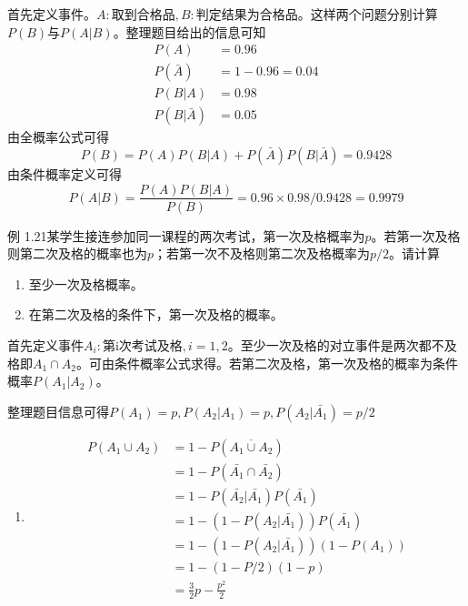 \documentclass{beamer}
\begin{document}
	\begin{frame}
		首先定义事件。$A: \text{取到合格品}, B: \text{判定结果为合格品}$。这样两个问题分别计算$P(B)$与$P(A | B)$。整理题目给出的信息可知
		\begin{align}
			P(A) &= 0.96 \\
			P(\bar{A}) &= 1 - 0.96 = 0.04 \\
			P(B | A) &= 0.98 \\
			P(B | \bar{A}) &= 0.05
		\end{align}
		由全概率公式可得
		\[
		P(B) = P(A) P(B | A) + P(\bar{A}) P(B | \bar{A}) = 0.9428
		\]
		由条件概率定义可得
		\[
		P(A | B) = \frac{P(A)P(B | A)}{P(B)} = 0.96 \times 0.98 / 0.9428 =0.9979
		\]
	\end{frame}
		
	\begin{frame}
		例 1.21某学生接连参加同一课程的两次考试，第一次及格概率为$p$。若第一次及格则第二次及格的概率也为$p$；若第一次不及格则第二次及格概率为$p / 2$。请计算
		\begin{enumerate}
			\item 至少一次及格概率。
			\item 在第二次及格的条件下，第一次及格的概率。
		\end{enumerate}
	\end{frame}
	
	\begin{frame}
		首先定义事件$A_i: \text{第i次考试及格}, i = 1, 2$。至少一次及格的对立事件是两次都不及格即$A_1 \cap A_2$。可由条件概率公式求得。若第二次及格，第一次及格的概率为条件概率$P(A_1 | A_2)$。
		
		\vspace*{1cm}
		整理题目信息可得$P(A_1) = p, P(A_2 | A_1) = p, P(A_2 | \bar{A_1}) = p /2 $
		\begin{enumerate}
			\item \begin{align}
				P(A_1 \cup A_2) & = 1 - P(\overline{A_1 \cup A_2}) \\
				& = 1 - P(\bar{A_1} \cap \bar{A_2}) \\
				& = 1 - P(\bar{A_2} | \bar{A_1})P(\bar{A_1}) \\
				& = 1 - (1 - P(A_2 | \bar{A_1}))P(\bar{A_1})  \\ 
				& = 1 - (1 - P(A_2 | \bar{A_1}))(1 - P(A_1)) \\
				& = 1 - (1 - P / 2)(1 - p) \\
				& = \frac{3}{2}p - \frac{p ^ 2}{2}
			\end{align}
		\end{enumerate}
	\end{frame}
	
\end{document}
